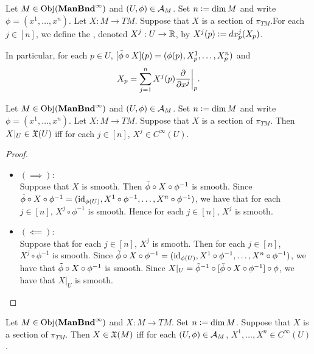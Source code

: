 \documentclass{book}
\begin{document}
\begin{defn}
	Let $M \in \operatorname{Obj}(\operatorname*{\text{\textbf{ManBnd}}^{\infty}})$ and $(U, \phi) \in \mathcal{A}_M$. Set $n \vcentcolon= \dim M$ and write $\phi = (x^1, \ldots, x^n)$. Let $X: M \rightarrow TM$. Suppose that $X$ is a section of $\pi_{TM}$.For each $j \in [n]$, we define the , denoted $X^j:U \rightarrow \mathbb{R}$, by $X^j(p) \vcentcolon= dx^j_p(X_p)$. 
\end{defn}

\begin{note}
	In particular, for each $p \in U$, $[\tilde{\phi} \circ X](p) = (\phi(p), X^1_p, \ldots, X^n_p)$ and 
	$$X_p = \sum\limits_{j=1}^n X^j(p) \frac{\partial}{\partial x^j} \bigg|_p.$$ 
\end{note}

\begin{ex}
	Let $M \in \operatorname{Obj}(\operatorname*{\text{\textbf{ManBnd}}^{\infty}})$ and $(U, \phi) \in \mathcal{A}_M$. Set $n \vcentcolon= \dim M$ and write $\phi = (x^1, \ldots, x^n)$. Let $X: M \rightarrow TM$. Suppose that $X$ is a section of $\pi_{TM}$. Then $X|_U \in \mathfrak{X}(U)$ iff for each $j \in [n]$, $X^j \in C^{\infty}(U)$.
\end{ex}

\begin{proof} \
	\begin{itemize}
		\item $(\implies)$: \\
		Suppose that $X$ is smooth. Then $\tilde{\phi} \circ X \circ \phi^{-1}$ is smooth. Since $\tilde{\phi} \circ X \circ \phi^{-1} = (\operatorname{id}_{\phi(U)}, X^1 \circ \phi^{-1}, \ldots, X^n \circ \phi^{-1})$, we have that for each $j \in [n]$, $X^j \circ \phi^{-1}$ is smooth. Hence for each $j \in [n]$, $X^j$ is smooth. 
		\item $(\impliedby)$: \\
		Suppose that for each $j \in [n]$, $X^j$ is smooth. Then for each $j \in [n]$, $X^j \circ \phi^{-1}$ is smooth. Since $\tilde{\phi} \circ X \circ \phi^{-1} = (\operatorname{id}_{\phi(U)}, X^1 \circ \phi^{-1}, \ldots, X^n \circ \phi^{-1})$, we have that $\tilde{\phi} \circ X \circ \phi^{-1}$ is smooth. Since $X|_U = \tilde{\phi}^{-1} \circ [\tilde{\phi} \circ X \circ \phi^{-1}] \circ \phi$, we have that $X|_U$ is smooth.
	\end{itemize}
\end{proof}

\begin{ex}
	Let $M \in \operatorname{Obj}(\operatorname*{\text{\textbf{ManBnd}}^{\infty}})$ and $X: M \rightarrow TM$. Set $n \vcentcolon= \dim M$. Suppose that $X$ is a section of $\pi_{TM}$. Then $X \in \mathfrak{X}(M)$ iff for each $(U, \phi) \in \mathcal{A}_M$, $X^1, \ldots, X^n \in C^{\infty}(U)$.
\end{ex}
\end{document}
